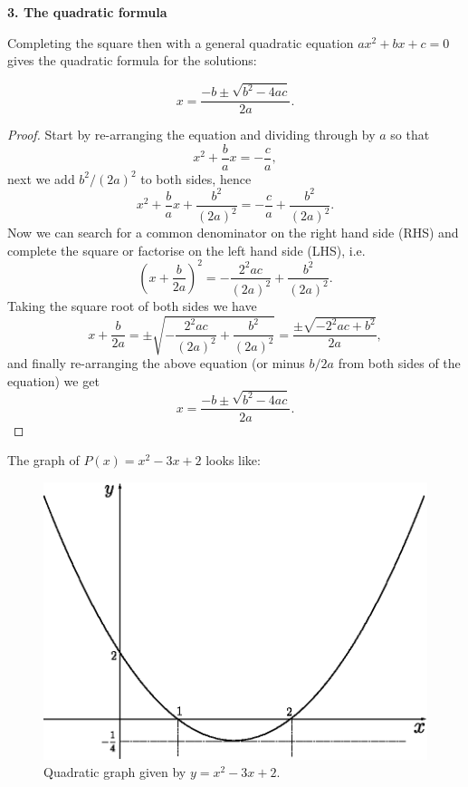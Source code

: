 \textbf{3. The quadratic formula}

Completing the square then with a general quadratic equation $ax^2+bx+c=0$ gives the quadratic formula for the solutions:

\begin{equation}
x=\frac{-b \pm \sqrt{b^2-4ac}}{2a}.
\end{equation}
\begin{proof}
Start by re-arranging the equation and dividing through by $a$ so that
\begin{equation*}
x^2 + \frac{b}{a}x = -\frac{c}{a},
\end{equation*}
next we add $b^2/(2a)^2$ to both sides, hence
\begin{equation*}
x^2 + \frac{b}{a}x +\frac{b^2}{(2a)^2} = -\frac{c}{a} + \frac{b^2}{(2a)^2}.
\end{equation*}
Now we can search for a common denominator on the right hand side (RHS) and complete the square or factorise on the left hand side (LHS), i.e.
\begin{equation*}
\left( x+\frac{b}{2a} \right)^2 = -\frac{2^2ac}{(2a)^2} + \frac{b^2}{(2a)^2}.
\end{equation*}
Taking the square root of both sides we have
\begin{equation*}
x+\frac{b}{2a} =\pm\sqrt{ -\frac{2^2ac}{(2a)^2} + \frac{b^2}{(2a)^2}}=\frac{\pm\sqrt{-2^2ac + b^2}}{2a},
\end{equation*}
and finally re-arranging the above equation (or minus $b/2a$ from both sides of the equation) we get
\begin{equation*}
x=\frac{-b \pm \sqrt{b^2-4ac}}{2a}.
\end{equation*}
\end{proof}


The graph of $P(x)=x^2-3x+2$ looks like:
\begin{figure}[H]
\centering
\includegraphics[scale=0.65]{img/quadratic-ex-1-6}
\captionstyle{\centering\it}
\caption{Quadratic graph given by $y=x^2-3x+2$.}
\label{fig:quadratic-ex-1-6}
\end{figure}

